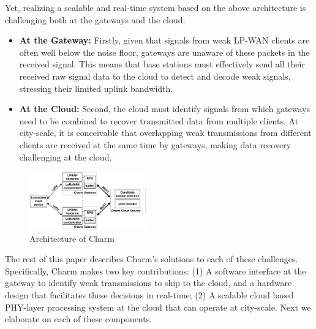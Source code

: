 Yet, realizing a scalable and real-time system based on the above architecture is challenging both at the gateways and the cloud: 
\begin{itemize}
\item {\bf At the Gateway: } Firstly, given that signals from weak LP-WAN
clients are often well below the noise floor, gateways are unaware of these
packets in the received signal. This means that base stations must effectively
send all their received raw signal data to the cloud to detect and decode weak
signals, stressing their limited uplink bandwidth.
\item {\bf At the Cloud: } Second, the cloud must identify signals from which gateways need to be combined to recover transmitted data from multiple clients. At city-scale, it is  conceivable that overlapping weak transmissions from different clients are received at the same time by gateways, making data recovery challenging at the cloud.
\end{itemize}


\begin{figure}[!htb]
    \centering
    \includegraphics[width=0.45\textwidth]{figures/charm-architecture_cropped.pdf}
    \caption{Architecture of Charm}
    \label{fig:architecture}
    \compactimg
\end{figure}


 The rest of this paper describes Charm's solutions to each of these
 challenges. Specifically, Charm makes two key contributions: (1) A software
 interface at the gateway to identify weak transmissions to ship to the cloud,
 and a hardware design that facilitates these decisions in real-time; (2) A
 scalable cloud based PHY-layer processing system at the cloud that can operate
 at city-scale. Next we elaborate on each of these components.




